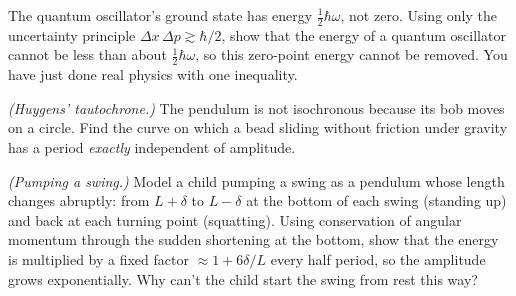 \begin{problems}
\core The quantum oscillator's ground state has energy $\tfrac12\hbar\omega$, not zero. Using only the uncertainty principle $\Delta x\,\Delta p\gtrsim\hbar/2$, show that the energy of a quantum oscillator cannot be less than about $\tfrac12\hbar\omega$, so this zero-point energy cannot be removed. You have just done real physics with one inequality.

\label{prob:tautochrone} \emph{(Huygens' tautochrone.)} The pendulum is not isochronous because its bob moves on a circle. Find the curve on which a bead sliding without friction under gravity has a period \emph{exactly} independent of amplitude.

 \emph{(Pumping a swing.)} Model a child pumping a swing as a pendulum whose length changes abruptly: from $L+\delta$ to $L-\delta$ at the bottom of each swing (standing up) and back at each turning point (squatting). Using conservation of angular momentum through the sudden shortening at the bottom, show that the energy is multiplied by a fixed factor $\approx 1+6\delta/L$ every half period, so the amplitude grows exponentially. Why can't the child start the swing from rest this way?
\end{problems}

\begin{reading}
\end{reading}
